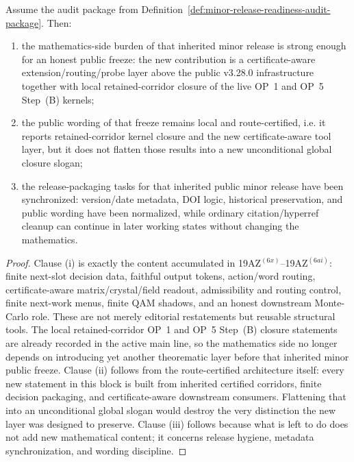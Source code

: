 \begin{proposition}
\label{prop:present-release-line-is-mathematically-minor-ready-and-release-packaged}
Assume the audit package from Definition~\ref{def:minor-release-readiness-audit-package}. Then:
\begin{enumerate}[label=(\roman*)]
  \item the mathematics-side burden of that inherited minor release is strong enough for an honest public freeze: the new contribution is a certificate-aware extension/routing/probe layer above the public v3.28.0 infrastructure together with local retained-corridor closure of the live OP~1 and OP~5 Step~(B) kernels;
  \item the public wording of that freeze remains local and route-certified, i.e. it reports retained-corridor kernel closure and the new certificate-aware tool layer, but it does not flatten those results into a new unconditional global closure slogan;
  \item the release-packaging tasks for that inherited public minor release have been synchronized: version/date metadata, DOI logic, historical preservation, and public wording have been normalized, while ordinary citation/hyperref cleanup can continue in later working states without changing the mathematics.
\end{enumerate}
\end{proposition}

\begin{proof}
Clause (i) is exactly the content accumulated in 19AZ$^{(6x)}$--19AZ$^{(6ai)}$: finite next-slot decision data, faithful output tokens, action/word routing, certificate-aware matrix/crystal/field readout, admissibility and routing control, finite next-work menus, finite QAM shadows, and an honest downstream Monte-Carlo role. These are not merely editorial restatements but reusable structural tools. The local retained-corridor OP~1 and OP~5 Step~(B) closure statements are already recorded in the active main line, so the mathematics side no longer depends on introducing yet another theorematic layer before that inherited minor public freeze. Clause (ii) follows from the route-certified architecture itself: every new statement in this block is built from inherited certified corridors, finite decision packaging, and certificate-aware downstream consumers. Flattening that into an unconditional global slogan would destroy the very distinction the new layer was designed to preserve. Clause (iii) follows because what is left to do does not add new mathematical content; it concerns release hygiene, metadata synchronization, and wording discipline.
\end{proof}

